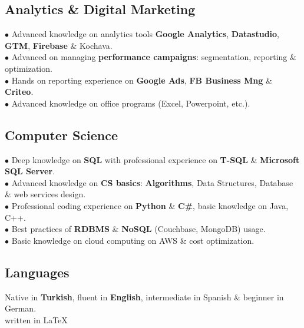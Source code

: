 \documentclass[11pt,twoside,a4paper]{article}
\begin{document}
    \subsection{Analytics \& Digital Marketing}
      $\bullet$ Advanced knowledge on analytics tools \textbf{Google Analytics}, \textbf{Datastudio}, \textbf{GTM}, \textbf{Firebase} \& Kochava.\\
      $\bullet$ Advanced on managing \textbf{performance campaigns}: segmentation, reporting \& optimization.\\
      $\bullet$ Hands on reporting experience on \textbf{Google Ads}, \textbf{FB Business Mng} \& \textbf{Criteo}.\\
      $\bullet$ Advanced knowledge on office programs (Excel, Powerpoint, etc.).
    \subsection{Computer Science}
      $\bullet$ Deep knowledge on \textbf{SQL} with professional experience on \textbf{T-SQL} \& \textbf{Microsoft SQL Server}.\\
      $\bullet$ Advanced knowledge on \textbf{CS basics}: \textbf{Algorithms}, Data Structures, Database \& web services design.\\
      $\bullet$ Professional coding experience on \textbf{Python} \& \textbf{C\#}, basic knowledge on Java, C++.\\
      $\bullet$ Best practices of \textbf{RDBMS} \& \textbf{NoSQL} (Couchbase, MongoDB) usage.\\
      $\bullet$ Basic knowledge on cloud computing on AWS \& cost optimization.
    \subsection{Languages}
      Native in \textbf{Turkish}, fluent in \textbf{English}, intermediate in Spanish \& beginner in German.\\

    \hfill written in \LaTeX
\end{document}
